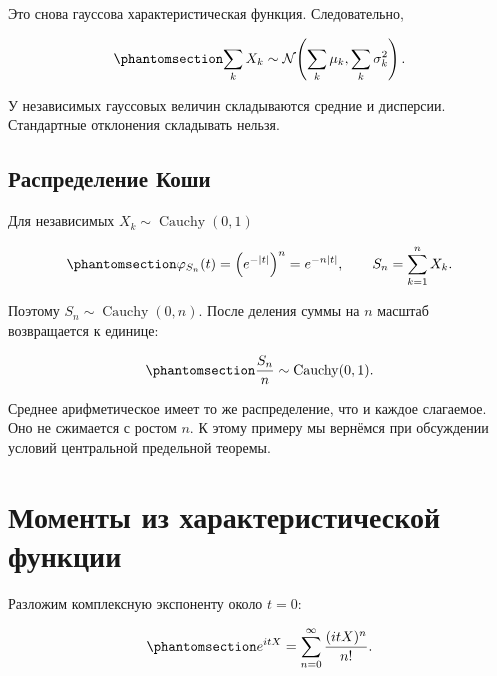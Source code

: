\documentclass[
  russian,
  11pt,
  a4paper,
  open=any]{scrbook}
\begin{document}
Это снова гауссова характеристическая функция. Следовательно,

\begin{equation}\protect\phantomsection\label{eq-gaussian-sum-distribution}{
\sum_k X_k
\sim
\mathcal N\!\left(
\sum_k\mu_k,
\sum_k\sigma_k^2
\right).
}\end{equation}

У независимых гауссовых величин складываются средние и дисперсии.
Стандартные отклонения складывать нельзя.

\subsection{Распределение
Коши}\label{ux440ux430ux441ux43fux440ux435ux434ux435ux43bux435ux43dux438ux435-ux43aux43eux448ux438}

Для независимых \(X_k\sim\operatorname{Cauchy}(0,1)\)

\begin{equation}\protect\phantomsection\label{eq-cauchy-many-sum-characteristic}{
\varphi_{S_n}(t)
=\left(e^{-|t|}\right)^n
=e^{-n|t|},
\qquad
S_n=\sum_{k=1}^{n}X_k.
}\end{equation}

Поэтому \(S_n\sim\operatorname{Cauchy}(0,n)\). После деления суммы на
\(n\) масштаб возвращается к единице:

\begin{equation}\protect\phantomsection\label{eq-cauchy-average-stability}{
\frac{S_n}{n}\sim\operatorname{Cauchy}(0,1).
}\end{equation}

Среднее арифметическое имеет то же распределение, что и каждое
слагаемое. Оно не сжимается с ростом \(n\). К этому примеру мы вернёмся
при обсуждении условий центральной предельной теоремы.

\section{Моменты из характеристической
функции}\label{ux43cux43eux43cux435ux43dux442ux44b-ux438ux437-ux445ux430ux440ux430ux43aux442ux435ux440ux438ux441ux442ux438ux447ux435ux441ux43aux43eux439-ux444ux443ux43dux43aux446ux438ux438}

Разложим комплексную экспоненту около \(t=0\):

\begin{equation}\protect\phantomsection\label{eq-complex-exponential-series}{
e^{itX}=\sum_{n=0}^{\infty}\frac{(itX)^n}{n!}.
}\end{equation}
\end{document}
